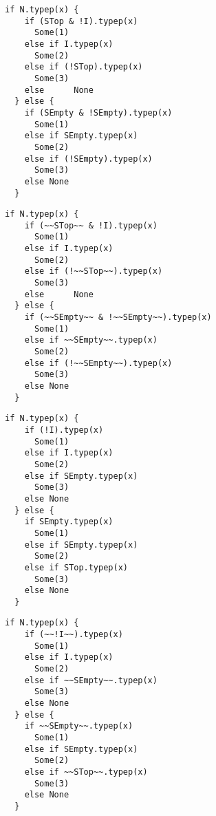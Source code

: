 \newsavebox\typecaseCbox
\begin{lrbox}{\typecaseCbox}
  \begin{minipage}{6cm}
\begin{lstlisting}[style=scalaioScala]
  if N.typep(x) {
    if (STop & !I).typep(x)
      Some(1)
    else if I.typep(x)
      Some(2)
    else if (!STop).typep(x)
      Some(3)
    else      None
  } else {
    if (SEmpty & !SEmpty).typep(x)
      Some(1)
    else if SEmpty.typep(x)
      Some(2)
    else if (!SEmpty).typep(x)
      Some(3)
    else None
  }
\end{lstlisting}
  \end{minipage}
\end{lrbox}

\newsavebox\typecaseChbox
\begin{lrbox}{\typecaseChbox}
  \begin{minipage}{6cm}
\begin{lstlisting}[style=scalaioScala]
  if N.typep(x) {
    if (~~STop~~ & !I).typep(x)
      Some(1)
    else if I.typep(x)
      Some(2)
    else if (!~~STop~~).typep(x)
      Some(3)
    else      None
  } else {
    if (~~SEmpty~~ & !~~SEmpty~~).typep(x)
      Some(1)
    else if ~~SEmpty~~.typep(x)
      Some(2)
    else if (!~~SEmpty~~).typep(x)
      Some(3)
    else None
  }
\end{lstlisting}
  \end{minipage}
\end{lrbox}

\newsavebox\typecaseDbox
\begin{lrbox}{\typecaseDbox}
  \begin{minipage}{8cm}
\begin{lstlisting}[style=scalaioScala]
  if N.typep(x) {
    if (!I).typep(x)
      Some(1)
    else if I.typep(x)
      Some(2)
    else if SEmpty.typep(x)
      Some(3)
    else None
  } else {
    if SEmpty.typep(x)
      Some(1)
    else if SEmpty.typep(x)
      Some(2)
    else if STop.typep(x)
      Some(3)
    else None
  }
\end{lstlisting}
  \end{minipage}
\end{lrbox}

\newsavebox\typecaseDhbox
\begin{lrbox}{\typecaseDhbox}
  \begin{minipage}{8cm}
\begin{lstlisting}[style=scalaioScala]
  if N.typep(x) {
    if (~~!I~~).typep(x)
      Some(1)
    else if I.typep(x)
      Some(2)
    else if ~~SEmpty~~.typep(x)
      Some(3)
    else None
  } else {
    if ~~SEmpty~~.typep(x)
      Some(1)
    else if SEmpty.typep(x)
      Some(2)
    else if ~~STop~~.typep(x)
      Some(3)
    else None
  }
\end{lstlisting}
  \end{minipage}
\end{lrbox}

